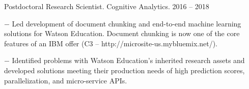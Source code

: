 \documentclass[10pt]{article}
\begin{document}
\begin{innerlist}
	\item Postdoctoral Research Scientist. Cognitive Analytics. \hfill {2016 -- 2018}
	\begin{innerlist}
    \item[$-$] Led development of document chunking and end-to-end machine learning solutions for Watson Education. Document chunking is now one of the core features of an IBM offer (C3 -- http://microsite-us.mybluemix.net/).
    \item[$-$] Identified problems with Watson Education's inherited research assets and developed solutions meeting their production needs of high prediction scores, parallelization, and micro-service APIs.

\end{innerlist}
\end{innerlist}
\end{document}

